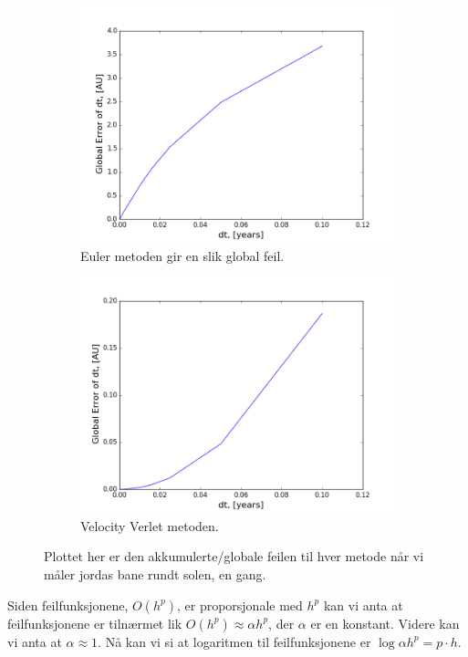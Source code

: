 \documentclass[11pt,a4paper]{article}
\begin{document}
\FloatBarrier
\begin{figure}[!ht]
\centering
\begin{subfigure}{.5\textwidth}
  \centering
  \includegraphics[width=1.1\linewidth]{Euler_Global.png}
  \caption{Euler metoden gir en slik global feil.}
  \label{feil_euler}
\end{subfigure}%
\begin{subfigure}{.5\textwidth}
  \centering
  \includegraphics[width=1.1\linewidth]{Verlet_Global.png}
  \caption{Velocity Verlet metoden. }
  \label{feil_verlet}
\end{subfigure}
\caption{Plottet her er den akkumulerte/globale feilen til hver metode når vi måler jordas bane rundt solen, en gang.}
\label{fig:duh}
\end{figure}
\FloatBarrier
Siden feilfunksjonene, $O(h^{p})$, er proporsjonale med $h^p$ kan vi anta at feilfunksjonene er tilnærmet lik $O(h^{p}) \approx \alpha h^p$, der $\alpha$ er en konstant. 
Videre kan vi anta at $\alpha \approx 1$. Nå kan vi si at logaritmen til feilfunksjonene er $\log{\alpha h^p} =p\cdot h$.
 
\end{document}
